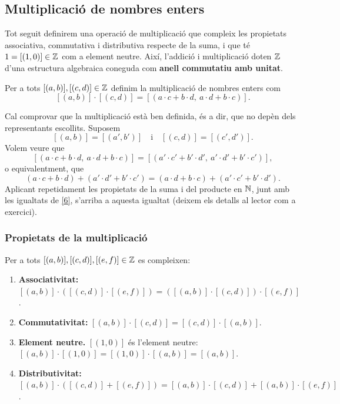 \subsection{Multiplicació de nombres enters}

Tot seguit definirem una operació de multiplicació que compleix les propietats associativa, commutativa i distributiva respecte de la suma, i que té $1=[(1,0)]\in \mathbb{Z}$ com a element neutre. Així, l'addició i multiplicació doten $\mathbb{Z}$ d'una estructura algebraica coneguda com \textbf{anell commutatiu amb unitat}.

\begin{definicio}
Per a tots $[(a,b)],[(c,d)]\in \mathbb{Z}$ definim la multiplicació de nombres enters com
\[
[(a,b)]\cdot [(c,d)]=[(a\cdot c+b\cdot d,\ a\cdot d+b\cdot c)].
\]
\end{definicio}

Cal comprovar que la multiplicació està ben definida, és a dir, que no depèn dels representants escollits. Suposem
\begin{equation}\label{6}
[(a,b)]=[(a',b')] \quad \text{i} \quad [(c,d)]=[(c',d')].
\end{equation}
Volem veure que
\[
[(a\cdot c+b\cdot d,\ a\cdot d+b\cdot c)]=[(a'\cdot c'+b'\cdot d',\ a'\cdot d'+b'\cdot c')],
\]
o equivalentment, que
\[
(a\cdot c+b\cdot d)+(a'\cdot d'+b'\cdot c')=(a\cdot d+b\cdot c)+(a'\cdot c'+b'\cdot d').
\]
Aplicant repetidament les propietats de la suma i del producte en $\mathbb{N}$, junt amb les igualtats de \eqref{6}, s'arriba a aquesta igualtat (deixem els detalls al lector com a exercici).

\subsubsection{Propietats de la multiplicació}

\begin{proposicio}
Per a tots $[(a,b)],[(c,d)],[(e,f)]\in \mathbb{Z}$ es compleixen:

\begin{enumerate}
\item \textbf{Associativitat:} $[(a,b)]\cdot \left([(c,d)]\cdot [(e,f)]\right) =\left([(a,b)]\cdot [(c,d)]\right) \cdot [(e,f)]$.
\item \textbf{Commutativitat:} $[(a,b)]\cdot [(c,d)]=[(c,d)]\cdot [(a,b)]$.
\item \textbf{Element neutre.} $[(1,0)]$ és l'element neutre: $[(a,b)]\cdot [(1,0)]=[(1,0)]\cdot [(a,b)]=[(a,b)]$.
\item \textbf{Distributivitat:} $[(a,b)]\cdot \left([(c,d)]+[(e,f)]\right) =[(a,b)]\cdot [(c,d)]+[(a,b)]\cdot [(e,f)]$.
\end{enumerate}
\end{proposicio}


